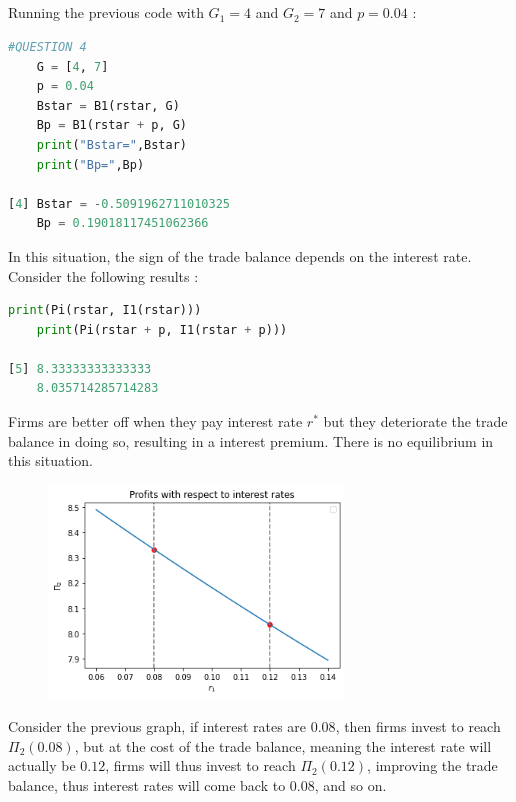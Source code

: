 \documentclass{article}
\begin{document}
\subsection{}
Running the previous code with $G_1 = 4$ and $G_2 = 7$ and $p = 0.04$ :
\begin{lstlisting}[language=Python, label=python_code]
    #QUESTION 4
    G = [4, 7]
    p = 0.04
    Bstar = B1(rstar, G)
    Bp = B1(rstar + p, G)
    print("Bstar=",Bstar)
    print("Bp=",Bp)

[4] Bstar = -0.5091962711010325
    Bp = 0.19018117451062366
\end{lstlisting}
In this situation, the sign of the trade balance depends on the interest rate. Consider the following results :
\begin{lstlisting}[language=Python, label=python_code]
    print(Pi(rstar, I1(rstar)))
    print(Pi(rstar + p, I1(rstar + p)))

[5] 8.33333333333333
    8.035714285714283
\end{lstlisting}
Firms are better off when they pay interest rate $r^*$ but they deteriorate the trade balance in doing so, resulting in a interest premium. There is no equilibrium in this situation.
\begin{figure}[H]
    \centering
    \includegraphics[width=0.7\textwidth]{media/output.png}
    \label{fig:mon_graphique}
\end{figure}
Consider the previous graph, if interest rates are $0.08$, then firms invest to reach $\Pi_2(0.08)$, but at the cost of the trade balance, meaning the interest rate will actually be $0.12$, firms will thus invest to reach $\Pi_2(0.12)$, improving the trade balance, thus interest rates will come back to $0.08$, and so on.
\newpage
\end{document}
